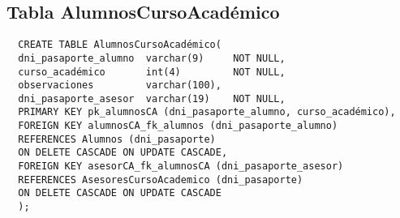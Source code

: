 \subsection{Tabla AlumnosCursoAcadémico}

\begin{verbatim}
  CREATE TABLE AlumnosCursoAcadémico(
  dni_pasaporte_alumno  varchar(9)     NOT NULL,
  curso_académico       int(4)         NOT NULL,
  observaciones         varchar(100),
  dni_pasaporte_asesor  varchar(19)    NOT NULL,
  PRIMARY KEY pk_alumnosCA (dni_pasaporte_alumno, curso_académico),
  FOREIGN KEY alumnosCA_fk_alumnos (dni_pasaporte_alumno)
  REFERENCES Alumnos (dni_pasaporte)
  ON DELETE CASCADE ON UPDATE CASCADE,
  FOREIGN KEY asesorCA_fk_alumnosCA (dni_pasaporte_asesor)
  REFERENCES AsesoresCursoAcademico (dni_pasaporte)
  ON DELETE CASCADE ON UPDATE CASCADE
  );
\end{verbatim}
